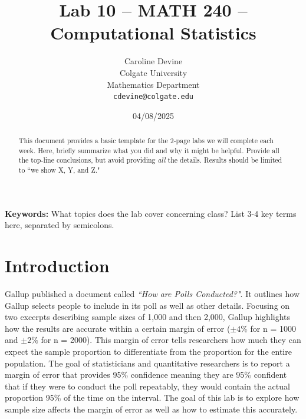 \documentclass{article}\usepackage[]{graphicx}\usepackage[]{xcolor}
\begin{document}
\vspace{-1in}
\title{Lab 10 -- MATH 240 -- Computational Statistics}

\author{
  Caroline Devine \\
  Colgate University  \\
  Mathematics Department  \\
  {\tt cdevine@colgate.edu}
}

\date{04/08/2025}

\maketitle

\begin{multicols}{2}
\begin{abstract}
This document provides a basic template for the 2-page labs we will complete each week. Here, briefly summarize what you did and why it might be helpful. Provide all the top-line conclusions, but avoid providing \emph{all} the details. Results should be limited to ``we show X, Y, and Z."
\end{abstract}

\noindent \textbf{Keywords:} What topics does the lab cover concerning class? List 3-4 key terms here, separated by semicolons.

\section{Introduction}

Gallup published a document called \emph{``How are Polls Conducted?"}. It outlines how Gallup selects people to include in its poll as well as other details. Focusing on two excerpts describing sample sizes of 1,000 and then 2,000, Gallup highlights how the results are accurate within a certain margin of error (\(\pm 4\% \) for n = 1000 and \(\pm 2\% \) for n = 2000). This margin of error tells researchers how much they can expect the sample proportion to differentiate from the proportion for the entire population. The goal of statisticians and quantitative researchers is to report a margin of error that provides 95\% confidence meaning they are 95\% confident that if they were to conduct the poll repeatably, they would contain the actual proportion 95\% of the time on the interval. The goal of this lab is to explore how sample size affects the margin of error as well as how to estimate this accurately. 


\end{multicols}
\end{document}
